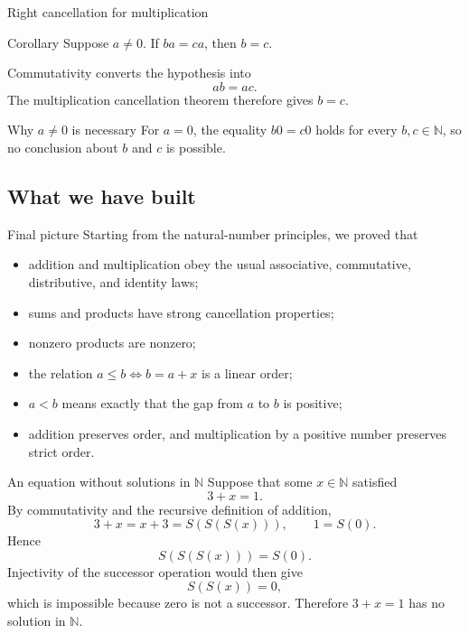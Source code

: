 \documentclass[aspectratio=169,11pt]{beamer}
\newcommand{\N}{\mathbb N}
\newcommand{\suc}[1]{S(#1)}
\begin{document}
\begin{frame}{Right cancellation for multiplication}
  \begin{block}{Corollary}
    Suppose \(a\ne0\).  If \(ba=ca\), then \(b=c\).
  \end{block}

  Commutativity converts the hypothesis into
  \[
    ab=ac.
  \]
  The multiplication cancellation theorem therefore gives \(b=c\).

  \begin{alertblock}{Why \(a\ne0\) is necessary}
    For \(a=0\), the equality \(b0=c0\) holds for every \(b,c\in\N\), so no
    conclusion about \(b\) and \(c\) is possible.
  \end{alertblock}
\end{frame}

\subsection{What we have built}

\begin{frame}{Final picture}
  Starting from the natural-number principles, we proved that
  \begin{itemize}
    \item addition and multiplication obey the usual associative,
      commutative, distributive, and identity laws;
    \item sums and products have strong cancellation properties;
    \item nonzero products are nonzero;
    \item the relation \(a\le b\iff b=a+x\) is a linear order;
    \item \(a<b\) means exactly that the gap from \(a\) to \(b\) is positive;
    \item addition preserves order, and multiplication by a positive number
      preserves strict order.
  \end{itemize}

\end{frame}

\begin{frame}{An equation without solutions in \(\N\)}
  Suppose that some \(x\in\N\) satisfied
  \[
    3+x=1.
  \]
  By commutativity and the recursive definition of addition,
  \[
    3+x=x+3=\suc{\suc{\suc x}},
    \qquad
    1=\suc 0.
  \]
  Hence
  \[
    \suc{\suc{\suc x}}=\suc 0.
  \]
  Injectivity of the successor operation would then give
  \[
    \suc{\suc x}=0,
  \]
  which is impossible because zero is not a successor.  Therefore
  \(3+x=1\) has no solution in \(\N\).
\end{frame}
\end{document}

